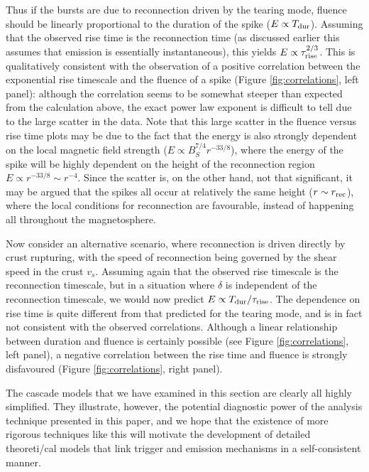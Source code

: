 \documentclass[12pt]{emulateapj}
\begin{document}
Thus if the bursts are due to reconnection driven by the tearing mode, fluence should be linearly proportional to the duration of the spike ($E\propto T_{\rm dur}$).  Assuming that the observed rise time is the reconnection time (as discussed earlier this assumes that emission is essentially instantaneous), this yields $E\propto\tau_{\rm rise}^{2/3}$.  This is qualitatively consistent with the observation of a positive correlation between the exponential rise timescale and the fluence of a spike (Figure \ref{fig:correlations}, left panel): although the correlation seems to be somewhat steeper than expected from the calculation above, the exact power law exponent is difficult to tell due to the large scatter in the data.   Note that this large scatter in the fluence versus rise time plots may be due to the fact that the energy is also strongly dependent on the local magnetic field strength ($E\propto B_S^{7/4}r^{-33/8}$), where the energy of the spike will be highly dependent on the height of the reconnection region $E\propto r^{-33/8}\sim r^{-4}$. Since the scatter is, on the other hand, not that significant, it may be argued that the spikes all occur at relatively the same height ($r\sim r_{\rm rec}$), where the local conditions for reconnection are favourable, instead of happening all throughout the magnetosphere.

Now consider an alternative scenario, where reconnection is driven directly by crust rupturing, with the speed of reconnection being governed by the shear speed in the crust $v_s$.  Assuming again that the observed rise timescale is the reconnection timescale, but in a situation where $\delta$ is independent of the reconnection timescale, we would now predict $E \propto T_\mathrm{dur}/\tau_{\rm rise}$.  The dependence on rise time is quite different from that predicted for the tearing mode, and is in fact not consistent with the observed correlations.  Although a linear relationship between duration and fluence is certainly possible (see Figure \ref{fig:correlations}, left panel), a negative correlation between the rise time and fluence is strongly disfavoured (Figure \ref{fig:correlations}, right panel).

The cascade models that we have examined in this section are clearly all highly simplified.  They illustrate, however, the potential diagnostic power of the analysis technique presented in this paper, and we hope that the existence of more rigorous techniques like this will motivate the development of detailed theoreti/cal models that link trigger and emission mechanisms in a self-consistent manner.  
\end{document}
